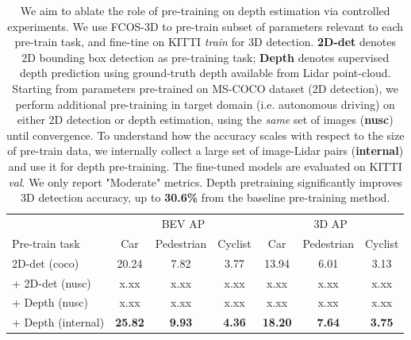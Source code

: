 
\begin{table}[t!]
\centering
{
\footnotesize
\setlength{\tabcolsep}{0.4em}
\begin{tabular}{l|ccc|ccc}
\toprule
& \multicolumn{3}{c}{BEV AP} & \multicolumn{3}{c}{3D AP} \\ 
\multirow{-2}{*}{Pre-train task}& 
Car & 
Pedestrian &
Cyclist &
Car & Pedestrian & Cyclist \vspace{0.5mm}\\
\midrule
2D-det (coco)  & 
20.24 & 
7.82 &
3.77 &
13.94 &
6.01 &
3.13
\\
\midrule
+ 2D-det (nusc) & 
x.xx & 
x.xx &
x.xx &
x.xx &
x.xx &
x.xx
\\
+ Depth  (nusc) & 
x.xx & 
x.xx &
x.xx &
x.xx &
x.xx &
x.xx
\\
\midrule
+ Depth (internal) & 
\textbf{25.82} & 
\textbf{9.93} &
\textbf{4.36} &
\textbf{18.20} &
\textbf{7.64} &
\textbf{3.75}
\\
\bottomrule
\end{tabular}\\\vspace{0mm}
\caption{We aim to ablate the role of pre-training on depth estimation via controlled experiments. We use FCOS-3D to pre-train subset of parameters relevant to each pre-train task, and fine-tine on KITTI \emph{train} for 3D detection. \textbf{2D-det} denotes 2D bounding box detection as pre-training task; \textbf{Depth} denotes supervised depth prediction using ground-truth depth available from Lidar point-cloud. Starting from parameters pre-trained on MS-COCO dataset (2D detection), we perform additional pre-training in target domain (i.e. autonomous driving) on either 2D detection or depth estimation, using the \emph{same} set of images (\textbf{nusc}) until convergence. To understand how the accuracy scales with respect to the size of pre-train data, we internally collect a large set of image-Lidar pairs (\textbf{internal}) and use it for depth pre-training. The fine-tuned models are evaluated on KITTI \emph{val}. We only report "Moderate" metrics. Depth pretraining significantly improves 3D detection accuracy, up to \textbf{30.6\%} from the baseline pre-training method.}
\label{table:dla-34}
}
\end{table}